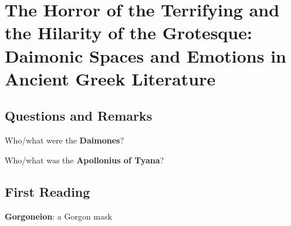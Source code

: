 %
%
%
\chapter{The Horror of the Terrifying and the Hilarity of the Grotesque: Daimonic Spaces and Emotions in Ancient Greek Literature}
\label{DaimonicSpaces} %








\abstract{}

\section{Questions and Remarks}
\label{sec:QR13}

\begin{qst}
    Who/what were the \textbf{Daimones}?
\end{qst}

\begin{qst}
    Who/what was the \textbf{Apollonius of Tyana}?
\end{qst}





\section{First Reading}
\label{sec:FirRead13}


\begin{defn}
    \textbf{Gorgoneion}: a Gorgon mask
\end{defn}


